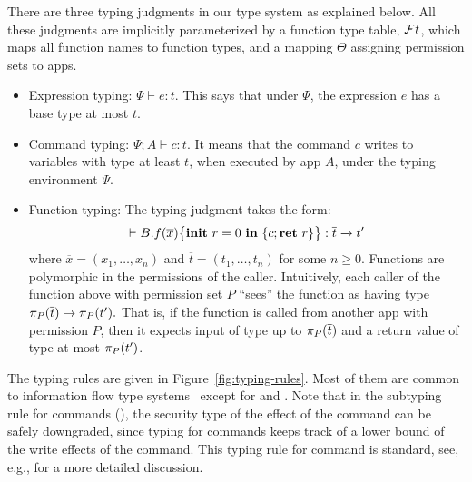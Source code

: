 {{{There are three typing judgments in our type system as explained below. All these judgments are implicitly parameterized by
a function type table, $\FT$, which maps all function names to function types, and a mapping $\Theta$ assigning permission sets to apps.

\begin{itemize}
\item Expression typing: $\Psi \vdash e : t.$
This says that under $\Psi$,
the expression $e$ has a base type at most $t$.

\item Command typing: $\Psi; A \vdash c : t$.
It means that the command $c$ writes to variables with type at least $t$, when
executed by app $A$, under the typing environment $\Psi.$

\item Function typing:
The typing judgment takes the form: 
{\myeqsize\begin{equation*}
\vdash \lpFUN{B.f}{\overline{x}}{c} :  \overline{t} \xrightarrow{} t'	
\end{equation*}}
where $\overline{x} = (x_1,\dots,x_n)$ and
$\overline{t} = (t_1,\dots,t_n)$ for some $n \geq 0.$
Functions are
polymorphic in the permissions of the caller.
Intuitively, each caller of the function above with permission set $P$
``sees'' the function as having type
$\app{\overline{t}}{P} \rightarrow \app{t'}{P}.$
That is, if the function is called from another app with permission $P$,
then it expects input of type up to $\app{\overline{t}}{P}$ and
a return value of type at most $\app{t'}{P}$.

\end{itemize}
The typing rules are given in Figure~\ref{fig:typing-rules}.
Most of them are common to
information flow type systems~\cite{Volpano:1996,Banerjee:2005ht,Sabelfeld:2003} except for  and . Note that in the subtyping rule for commands (), the security type of the effect of the command
can be safely downgraded, since typing for commands keeps track of a lower bound of the write effects of the command. This typing rule for
command is standard, see, e.g., \cite{Volpano:1996} for a more detailed discussion.

}}}
